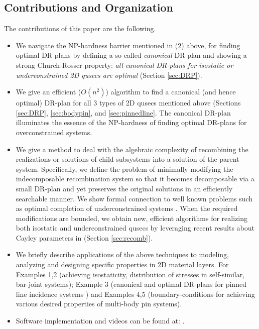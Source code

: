 \subsection{Contributions and Organization}
\label{sec:cont}
The contributions of this paper are the following.
\begin{itemize}
\item
We  navigate the NP-hardness barrier mentioned in (2) above, for finding
optimal DR-plans by defining a
so-called {\it canonical} DR-plan and showing a strong Church-Rosser
property: {\it all canonical DR-plans for isostatic or
underconstrained
2D qusecs are optimal} (Section \ref{sec:DRP}).
\item
We give an efficient ($O(n^2)$) algorithm to find a canonical (and hence
optimal) DR-plan for all 3 types of 2D qusecs mentioned above (Sections
\ref{sec:DRP}, \ref{sec:bodypin}, and \ref{sec:pinnedline}.
The canonical DR-plan
illuminates the essence of the NP-hardness of finding optimal DR-plans for
overconstrained systems.
\item
We give a method to deal with the
algebraic complexity of recombining the realizations or
solutions of  child subsystems into a solution of the parent system.
Specifically, we define the problem of  minimally modifying the
indecomposable recombination system so that it becomes decomposable via a
 small DR-plan and yet preserves the original
solutions in an efficiently searchable manner. We show formal connection
to well known problems such as optimal completion of
underconstrained  systems  \cite{XX}.  When the required modifications
are bounded, we obtain new, efficient algorithms for
realizing both isostatic and underconstrained
qusecs by leveraging recent results about Cayley parameters in
\cite{XX,XX}  (Section \ref{sec:recomb}).
\item
We briefly describe applications of the above techniques to modeling,
analyzing and designing specific properties in 2D material layers.
For Examples 1,2 (achieving isostaticity, distribution of stresses in
self-similar, bar-joint systems); Example 3 (canonical and optimal
DR-plans for pinned line incidence systems \cite{XX}) and Examples 4,5
(boundary-conditions for achieving various desired properties
of multi-body  pin systems).

\item
Software implementation and videos can be found at: .
\end{itemize}
